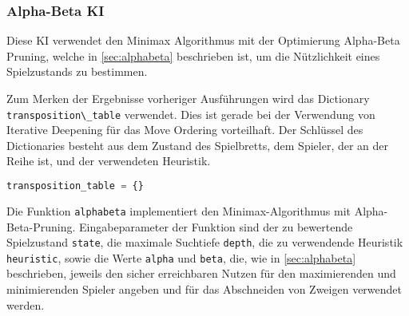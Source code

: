 \hypertarget{alpha-beta-ki}{%
\subsubsection{Alpha-Beta KI}\label{alpha-beta-ki}}

Diese \ac{KI} verwendet den Minimax Algorithmus mit der Optimierung
Alpha-Beta Pruning, welche in \autoref{sec:alphabeta} beschrieben ist,
um die Nützlichkeit eines Spielzustands zu bestimmen.

Zum Merken der Ergebnisse vorheriger Ausführungen wird das Dictionary
\passthrough{\lstinline!transposition\_table!} verwendet. Dies ist
gerade bei der Verwendung von Iterative Deepening für das Move Ordering
vorteilhaft. Der Schlüssel des Dictionaries besteht aus dem Zustand des
Spielbretts, dem Spieler, der an der Reihe ist, und der verwendeten
Heuristik.

\begin{lstlisting}[language=Python]
transposition_table = {}
\end{lstlisting}

Die Funktion \passthrough{\lstinline!alphabeta!} implementiert den
Minimax-Algorithmus mit Alpha-Beta-Pruning. Eingabeparameter der
Funktion sind der zu bewertende Spielzustand
\passthrough{\lstinline!state!}, die maximale Suchtiefe
\passthrough{\lstinline!depth!}, die zu verwendende Heuristik
\passthrough{\lstinline!heuristic!}, sowie die Werte
\passthrough{\lstinline!alpha!} und \passthrough{\lstinline!beta!}, die,
wie in \autoref{sec:alphabeta} beschrieben, jeweils den sicher
erreichbaren Nutzen für den maximierenden und minimierenden Spieler
angeben und für das Abschneiden von Zweigen verwendet werden.

